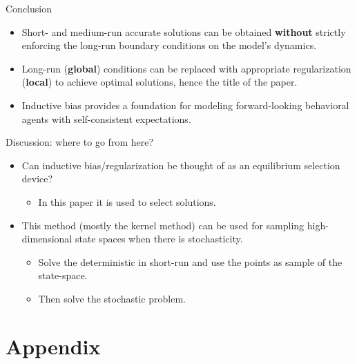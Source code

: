 \documentclass[aspectratio=169,10pt]{beamer}
\newcommand{\emphcolor}[1]{\textbf{\textcolor{emphcolorval}{#1}}}
\begin{document}
\begin{frame}{Conclusion}
	\begin{itemize}
		\item Short- and medium-run accurate solutions can be obtained \emphcolor{without} strictly enforcing the long-run boundary  conditions on the model’s dynamics.
		\vspace{0.1in}
		\item Long-run (\emphcolor{global}) conditions can be replaced with appropriate regularization (\emphcolor{local}) to achieve optimal solutions, hence the title of the paper.
		\vspace{0.1in}
		\item Inductive bias provides a foundation for modeling forward-looking behavioral agents with self-consistent expectations.
	\end{itemize}
\end{frame}

\begin{frame}{Discussion: where to go from here?}
	\begin{itemize}
		\item Can inductive bias/regularization be thought of as an equilibrium selection device?
		\begin{itemize}
			\item In this paper it is used to select solutions.
		\end{itemize}
		\smallskip
		\item This method (mostly the kernel method) can be used for sampling high-dimensional state spaces when there is stochasticity. 
		\begin{itemize}
		\item Solve the deterministic in short-run and use the points as sample of the state-space.
		\smallskip
		\item Then solve the stochastic problem.
		\end{itemize}
	\end{itemize}
\end{frame}

\section{Appendix}
\end{document}
